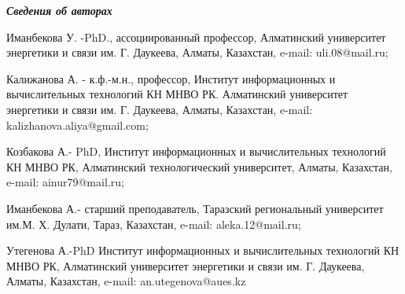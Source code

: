 \emph{\textbf{Сведения об авторах}}

Иманбекова У. -PhD., ассоциированный профессор, Алматинский университет
энергетики и связи им. Г. Даукеева, Алматы, Казахстан, e-mail:
uli.08@mail.ru;

Калижанова А. - к.ф.-м.н., профессор, Институт информационных и
вычислительных технологий КН МНВО РК. Алматинский университет энергетики
и связи им. Г. Даукеева, Алматы, Казахстан, e-mail:
kalizhanova.aliya@gmail.com;

Козбакова А.- PhD, Институт информационных и вычислительных технологий
КН МНВО РК, Алматинский технологический университет, Алматы, Казахстан,
e-mail: ainur79@mail.ru;

Иманбекова А.- старший преподаватель, Таразский региональный университет
им.М. Х. Дулати, Тараз, Казахстан, e-mail: aleka.12@mail.ru;

Утегенова А.-PhD Институт информационных и вычислительных технологий КН
МНВО РК, Алматинский университет энергетики и связи им. Г. Даукеева,
Алматы, Казахстан, e-mail: an.utegenova@aues.kz
